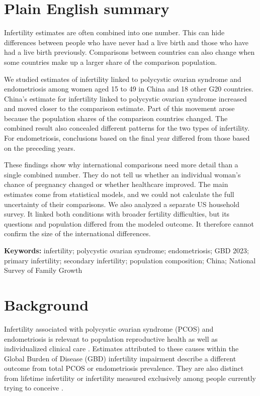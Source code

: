 \documentclass[11pt,a4paper]{article}
\begin{document}
\section*{Plain English summary}
Infertility estimates are often combined into one number. This can hide differences between people who have never had a live birth and those who have had a live birth previously. Comparisons between countries can also change when some countries make up a larger share of the comparison population.

We studied estimates of infertility linked to polycystic ovarian syndrome and endometriosis among women aged 15 to 49 in China and 18 other G20 countries. China's estimate for infertility linked to polycystic ovarian syndrome increased and moved closer to the comparison estimate. Part of this movement arose because the population shares of the comparison countries changed. The combined result also concealed different patterns for the two types of infertility. For endometriosis, conclusions based on the final year differed from those based on the preceding years.

These findings show why international comparisons need more detail than a single combined number. They do not tell us whether an individual woman's chance of pregnancy changed or whether healthcare improved. The main estimates come from statistical models, and we could not calculate the full uncertainty of their comparisons. We also analyzed a separate US household survey. It linked both conditions with broader fertility difficulties, but its questions and population differed from the modeled outcome. It therefore cannot confirm the size of the international differences.

\textbf{Keywords:} infertility; polycystic ovarian syndrome; endometriosis; GBD 2023; primary infertility; secondary infertility; population composition; China; National Survey of Family Growth

\section{Background}
Infertility associated with polycystic ovarian syndrome (PCOS) and endometriosis is relevant to population reproductive health as well as individualized clinical care \cite{pcos,eshre}. Estimates attributed to these causes within the Global Burden of Disease (GBD) infertility impairment describe a different outcome from total PCOS or endometriosis prevalence. They are also distinct from lifetime infertility or infertility measured exclusively among people currently trying to conceive \cite{gbd}.
\end{document}
